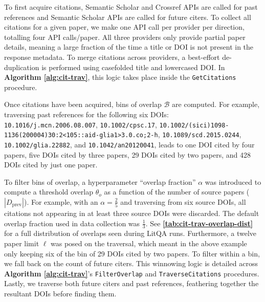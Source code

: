To first acquire citations, Semantic Scholar \cite{semantic-scholar} and Crossref \cite{crossref} APIs are called for past references and Semantic Scholar APIs are called for future citers. To collect all citations for a given paper, we make one API call per provider per direction, totalling four API calls/paper. All three providers only provide partial paper details, meaning a large fraction of the time a title or DOI is not present in the response metadata. To merge citations across providers, a best-effort de-duplication is performed using casefolded title and lowercased DOI. In \textbf{Algorithm \ref{alg:cit-trav}}, this logic takes place inside the \texttt{GetCitations} procedure.

Once citations have been acquired, bins of overlap $\mathcal{B}$ are computed. For example, traversing past references for the following six DOIs:
\texttt{10.1016/j.mcn.2006.08.007}, \texttt{10.1002/cpsc.17}, \texttt{10.1002/(sici)1098- 1136(200004)30:2<105::aid-glia1>3.0.co;2-h}, \texttt{10.1089/scd.2015.0244}, \texttt{10.1002/glia.22882}, and \texttt{10.1042/an20120041},
leads to one DOI cited by four papers, five DOIs cited by three papers, 29 DOIs cited by two papers, and 428 DOIs cited by just one paper.

To filter bins of overlap, a hyperparameter ``overlap fraction'' $\alpha$ was introduced to compute a threshold overlap $\theta_o$ as a function of the number of source papers ($|D_\text{prev}|$). For example, with an $\alpha = \frac{2}{5}$ and traversing from six source DOIs, all citations not appearing in at least three source DOIs were discarded. The default overlap fraction used in data collection was $\frac{1}{3}$. See \textbf{\autoref{tab:cit-trav-overlap-dist}} for a full distribution of overlaps seen during LitQA runs. Furthermore, a twelve paper limit $\ell$ was posed on the traversal, which meant in the above example only keeping six of the bin of 29 DOIs cited by two papers. To filter within a bin, we fall back on the count of future citers. This winnowing logic is detailed across \textbf{Algorithm \ref{alg:cit-trav}}'s \texttt{FilterOverlap} and \texttt{TraverseCitations} procedures. Lastly, we traverse both future citers and past references, feathering together the resultant DOIs before finding them. 


